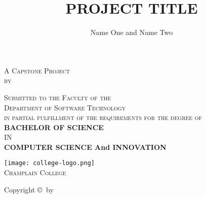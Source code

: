 
\title{PROJECT TITLE} %
\author{Name One and Name Two} %

\makeatletter
\let\thetitle\@title
\let\theauthors\@author
\makeatother

{
	\centering
    {\Huge\textsc{\thetitle}\unskip\strut\par}
	\vspace{1 in}
    \textsc{
      A Capstone Project \\
      by \\
    }
    {\bfseries \textsc{\theauthors} \unskip\strut\par}
    \vspace{1 in}
  	\textsc{
    	Submitted to the Faculty of the \\
		Department of Software Technology \\
		in partial fulfillment of the requirements for the degree of \\
	}
    \vspace{0.5 in}
    {\bfseries BACHELOR OF SCIENCE \\}
    IN \\
    {\bfseries COMPUTER SCIENCE And INNOVATION}

    \vspace{1 in}
   	\texttt{[image: college-logo.png]} \\
    \textsc{\large Champlain College \\}
    \the\year

    \newpage
    \vspace*{\fill}
    Copyright \copyright $~$ by \theauthors \\ \the\year
    \vspace*{\fill}   
    
}
